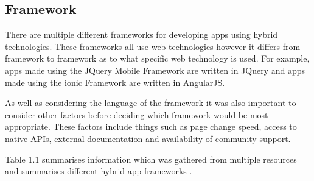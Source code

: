 \subsection{Framework}
There are multiple different frameworks for developing apps using hybrid technologies. These frameworks all use web technologies however it differs from framework to framework as to what specific web technology is used. For example, apps made using the JQuery Mobile Framework are written in JQuery and apps made using the ionic Framework are written in AngularJS.

As well as considering the language of the framework it was also important to consider other factors before deciding which framework would be most appropriate. These factors include things such as page change speed, access to native APIs, external documentation and availability of community support.

Table 1.1 summarises information which was gathered from multiple resources and summarises  different hybrid app frameworks \cite{cord} \cite{cordova}  \cite{jquerymob} \cite{ionic} \cite{f7} \cite{hab}.

